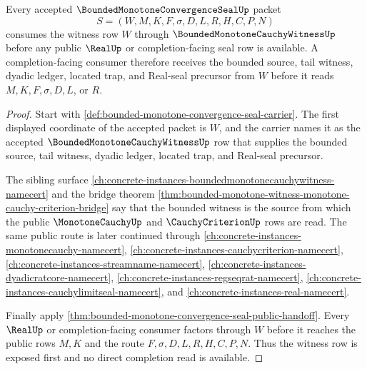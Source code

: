 \begin{theorem}
\label{thm:bounded-monotone-convergence-seal-witness-consumption}
Every accepted $\BoundedMonotoneConvergenceSealUp$ packet
$$
S=(W,M,K,F,\sigma,D,L,R,H,C,P,N)
$$
consumes the witness row $W$ through $\BoundedMonotoneCauchyWitnessUp$ before any public $\RealUp$ or completion-facing seal row is available. A completion-facing consumer therefore receives the bounded source, tail witness, dyadic ledger, located trap, and Real-seal precursor from $W$ before it reads $M,K,F,\sigma,D,L$, or $R$.
\end{theorem}
\begin{proof}
Start with \autoref{def:bounded-monotone-convergence-seal-carrier}. The first displayed coordinate of the accepted packet is $W$, and the carrier names it as the accepted $\BoundedMonotoneCauchyWitnessUp$ row that supplies the bounded source, tail witness, dyadic ledger, located trap, and Real-seal precursor.

The sibling surface \autoref{ch:concrete-instances-boundedmonotonecauchywitness-namecert} and the bridge theorem \autoref{thm:bounded-monotone-witness-monotone-cauchy-criterion-bridge} say that the bounded witness is the source from which the public $\MonotoneCauchyUp$ and $\CauchyCriterionUp$ rows are read. The same public route is later continued through \autoref{ch:concrete-instances-monotonecauchy-namecert}, \autoref{ch:concrete-instances-cauchycriterion-namecert}, \autoref{ch:concrete-instances-streamname-namecert}, \autoref{ch:concrete-instances-dyadicratcore-namecert}, \autoref{ch:concrete-instances-regseqrat-namecert}, \autoref{ch:concrete-instances-cauchylimitseal-namecert}, and \autoref{ch:concrete-instances-real-namecert}.

Finally apply \autoref{thm:bounded-monotone-convergence-seal-public-handoff}. Every $\RealUp$ or completion-facing consumer factors through $W$ before it reaches the public rows $M,K$ and the route $F,\sigma,D,L,R,H,C,P,N$. Thus the witness row is exposed first and no direct completion read is available.
\end{proof}

